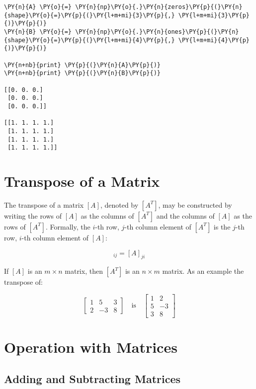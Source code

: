     \begin{tcolorbox}[breakable, size=fbox, boxrule=1pt, pad at break*=1mm,colback=cellbackground, colframe=cellborder]
\begin{Verbatim}[commandchars=\\\{\}]
\PY{n}{A} \PY{o}{=} \PY{n}{np}\PY{o}{.}\PY{n}{zeros}\PY{p}{(}\PY{n}{shape}\PY{o}{=}\PY{p}{(}\PY{l+m+mi}{3}\PY{p}{,} \PY{l+m+mi}{3}\PY{p}{)}\PY{p}{)}
\PY{n}{B} \PY{o}{=} \PY{n}{np}\PY{o}{.}\PY{n}{ones}\PY{p}{(}\PY{n}{shape}\PY{o}{=}\PY{p}{(}\PY{l+m+mi}{4}\PY{p}{,} \PY{l+m+mi}{4}\PY{p}{)}\PY{p}{)}

\PY{n+nb}{print} \PY{p}{(}\PY{n}{A}\PY{p}{)}
\PY{n+nb}{print} \PY{p}{(}\PY{n}{B}\PY{p}{)}

[[0. 0. 0.]
 [0. 0. 0.]
 [0. 0. 0.]]

[[1. 1. 1. 1.]
 [1. 1. 1. 1.]
 [1. 1. 1. 1.]
 [1. 1. 1. 1.]]
    \end{Verbatim}
\end{tcolorbox}

\section{Transpose of a Matrix}
The transpose of a matrix $[A]$, denoted by $[A^{T}]$, may be constructed by writing the rows of $[A]$ as the columns of $[A^T]$
and the columns of $[A]$ as the rows of $[A^T]$.
Formally, the $i$-th row, $j$-th column element of $[A^T]$ is the $j$-th row, $i$-th column element of $[A]$:

\begin{equation}[A^T]_{ij} = [A]_{ji}\end{equation}

If $[A]$ is an $m\times n$ matrix, then $[A^T]$ is an $n\times m$ matrix. 
As an example the transpose of:

\[
\begin{bmatrix}
1 & 5 & 3 \\
2 & -3 & 8
\end{bmatrix}
\quad \mathrm{is} \quad
\begin{bmatrix}
1 & 2 \\
5 & -3 \\
3  & 8
\end{bmatrix}
\]

\section{Operation with Matrices}
\subsection{Adding and Subtracting Matrices}\label{adding-and-subtracting-matrices}

